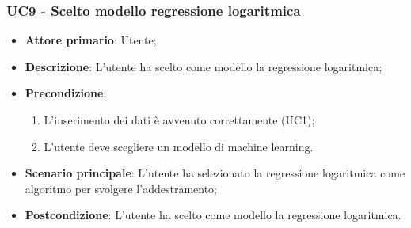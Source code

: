 \subsubsection{UC9 - Scelto modello regressione logaritmica}
\label{sssec:uc9}
\begin{itemize}
  \item \textbf{Attore primario}: Utente;
  \item \textbf{Descrizione}: L'utente ha scelto come modello la regressione logaritmica;
  \item \textbf{Precondizione}:
  \begin{enumerate}
    \item L'inserimento dei dati è avvenuto correttamente (UC1);
    \item L'utente deve scegliere un modello di machine learning.
  \end{enumerate}
  \item \textbf{Scenario principale}: L'utente ha selezionato la regressione logaritmica come algoritmo per svolgere l'addestramento;
  \item \textbf{Postcondizione}: L'utente ha scelto come modello la regressione logaritmica.
\end{itemize}
